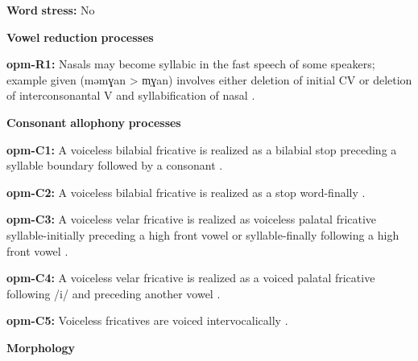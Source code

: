 \begin{styleBody}
\textbf{Word} \textbf{stress:} No
\end{styleBody}

\begin{styleBody}
\textbf{Vowel} \textbf{reduction} \textbf{processes}
\end{styleBody}

\begin{styleBody}
\textbf{opm-R1:} Nasals may become syllabic in the fast speech of some speakers; example given (məmɣan > m̩ɣan) involves either deletion of initial CV or deletion of interconsonantal V and syllabification of nasal \citep[64]{Loughnane2009}.
\end{styleBody}

\begin{styleBody}
\textbf{Consonant} \textbf{allophony} \textbf{processes}
\end{styleBody}

\begin{styleBody}
\textbf{opm-C1:} A voiceless bilabial fricative is realized as a bilabial stop preceding a syllable boundary followed by a consonant \citep[33]{Loughnane2009}.
\end{styleBody}

\begin{styleBody}
\textbf{opm-C2:} A voiceless bilabial fricative is realized as a stop word-finally \citep[33]{Loughnane2009}.
\end{styleBody}

\begin{styleBody}
\textbf{opm-C3:} A voiceless velar fricative is realized as voiceless palatal fricative syllable-initially preceding a high front vowel or syllable-finally following a high front vowel \citep[42]{Loughnane2009}.
\end{styleBody}

\begin{styleBody}
\textbf{opm-C4:} A voiceless velar fricative is realized as a voiced palatal fricative following /i/ and preceding another vowel \citep[42]{Loughnane2009}.
\end{styleBody}

\begin{styleBody}
\textbf{opm-C5:} Voiceless fricatives are voiced intervocalically \citep[42]{Loughnane2009}.
\end{styleBody}

\begin{styleBody}
\textbf{Morphology}
\end{styleBody}

